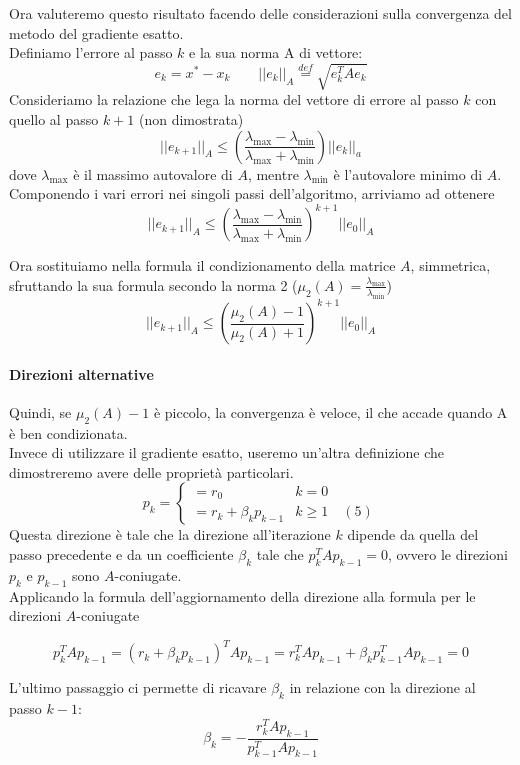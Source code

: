Ora valuteremo questo risultato facendo delle considerazioni sulla
convergenza del metodo del gradiente esatto.  \\ 
Definiamo l'errore al passo $k$ e la sua norma A di vettore:
$$ e_{k} = x^{*} - x_{k} \qquad ||e_{k} ||_{A} \stackrel{def}{=} \sqrt{e_{k}^{T} A e_{k}}$$
Consideriamo la relazione che lega la norma del vettore di errore al
passo $k$ con quello al passo $k+1$ (non dimostrata)
$$ || e_{k+1} ||_{A} \leq 
\left( \frac{\lambda_{\max} - \lambda_{\min}}{\lambda_{\max}+
\lambda_{\min}}\right) ||{e_{k}}||_{a}$$ dove $\lambda_{\max}$ \`e il
massimo autovalore di $A$, mentre $\lambda_{\min}$ \`e l'autovalore
minimo di $A$.  Componendo i vari errori nei singoli passi
dell'algoritmo, arriviamo ad ottenere
$$ || e_{k+1} ||_{A} \leq 
\left( \frac{\lambda_{\max} - \lambda_{\min}}{\lambda_{\max}+
\lambda_{\min}}\right)^{k+1} ||{e_{0}}||_{A}$$

Ora sostituiamo nella formula il condizionamento della matrice $A$, simmetrica,
sfruttando la sua formula secondo la norma 2 ($ \mu_{2}(A) =
\frac{\lambda_{\max}}{\lambda_{\min}}$)
$$ || e_{k+1} ||_{A} \leq 
\left( \frac{\mu_{2}(A) -1 }{\mu_{2}(A) +1}\right)^{k+1}
||{e_{0}}||_{A}$$

\paragraph{Direzioni alternative}
Quindi, se $\mu_{2}(A) -1$ \`e piccolo, la convergenza \`e veloce, il che
accade quando A \`e ben condizionata.  \\ Invece di utilizzare il
gradiente esatto, useremo un'altra definizione che dimostreremo avere
delle proprietà particolari.
$$
p_{k} = \left\{
\begin{array}{ll} = r_0 & k=0 \\ = r_{k} + \beta_{k}p_{k-1} & k \geq 1
\quad (5)
\end{array} \right.
$$
Questa direzione \`e tale che la direzione all'iterazione $k$ dipende da
quella del passo precedente e da un coefficiente $\beta_{k}$ tale che
$p_{k}^{T} A p_{k-1} = 0$, ovvero le direzioni $p_{k}$ e $p_{k-1}$
sono $A$-coniugate.  \\ Applicando la formula dell'aggiornamento della
direzione alla formula per le direzioni $A$-coniugate

$$ p_{k}^{T}Ap_{k-1}= (r_{k}+ \beta_{k} p_{k-1})^{T} A  p_{k-1} = 
  r_{k}^{T} A p_{k-1} + \beta_{k} p_{k-1}^{T} A p_{k-1}=0$$

L'ultimo passaggio ci permette di ricavare $\beta_{k}$ in relazione
con la direzione al passo $k-1$:
$$
\beta_{k}= -\frac{r_{k}^{T}Ap_{k-1}}{p_{k-1}^{T}Ap_{k-1}}
$$

